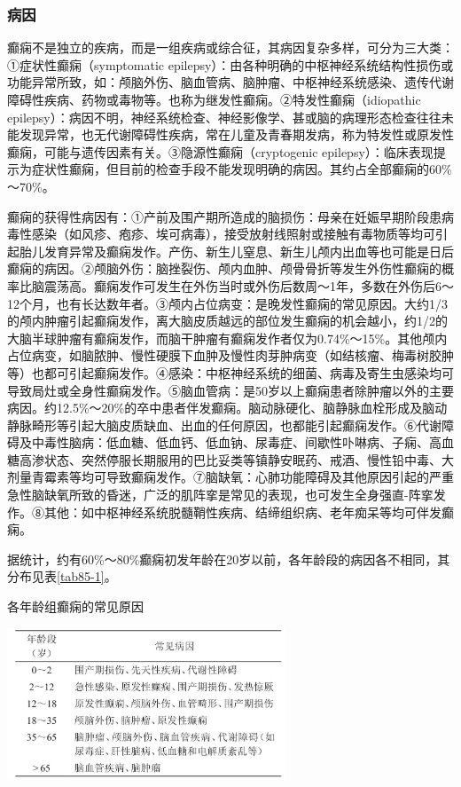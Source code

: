 \subsubsection{病因}

癫痫不是独立的疾病，而是一组疾病或综合征，其病因复杂多样，可分为三大类：①症状性癫痫（symptomatic
epilepsy）：由各种明确的中枢神经系统结构性损伤或功能异常所致，如：颅脑外伤、脑血管病、脑肿瘤、中枢神经系统感染、遗传代谢障碍性疾病、药物或毒物等。也称为继发性癫痫。②特发性癫痫（idiopathic
epilepsy）：病因不明，神经系统检查、神经影像学、甚或脑的病理形态检查往往未能发现异常，也无代谢障碍性疾病，常在儿童及青春期发病，称为特发性或原发性癫痫，可能与遗传因素有关。③隐源性癫痫（cryptogenic
epilepsy）：临床表现提示为症状性癫痫，但目前的检查手段不能发现明确的病因。其约占全部癫痫的60\%～70\%。

癫痫的获得性病因有：①产前及围产期所造成的脑损伤：母亲在妊娠早期阶段患病毒性感染（如风疹、疱疹、埃可病毒），接受放射线照射或接触有毒物质等均可引起胎儿发育异常及癫痫发作。产伤、新生儿窒息、新生儿颅内出血等也可能是日后癫痫的病因。②颅脑外伤：脑挫裂伤、颅内血肿、颅骨骨折等发生外伤性癫痫的概率比脑震荡高。癫痫发作可发生在外伤当时或外伤后数周～1年，多数在外伤后6～12个月，也有长达数年者。③颅内占位病变：是晚发性癫痫的常见原因。大约1/3的颅内肿瘤引起癫痫发作，离大脑皮质越远的部位发生癫痫的机会越小，约1/2的大脑半球肿瘤有癫痫发作，而脑干肿瘤有癫痫发作者仅为0.74\%～15\%。其他颅内占位病变，如脑脓肿、慢性硬膜下血肿及慢性肉芽肿病变（如结核瘤、梅毒树胶肿等）也都可引起癫痫发作。④感染：中枢神经系统的细菌、病毒及寄生虫感染均可导致局灶或全身性癫痫发作。⑤脑血管病：是50岁以上癫痫患者除肿瘤以外的主要病因。约12.5\%～20\%的卒中患者伴发癫痫。脑动脉硬化、脑静脉血栓形成及脑动静脉畸形等引起大脑皮质缺血、出血的任何原因，也都能引起癫痫发作。⑥代谢障碍及中毒性脑病：低血糖、低血钙、低血钠、尿毒症、间歇性卟啉病、子痫、高血糖高渗状态、突然停服长期服用的巴比妥类等镇静安眠药、戒酒、慢性铅中毒、大剂量青霉素等均可导致癫痫发作。⑦脑缺氧：心肺功能障碍及其他原因引起的严重急性脑缺氧所致的昏迷，广泛的肌阵挛是常见的表现，也可发生全身强直-阵挛发作。⑧其他：如中枢神经系统脱髓鞘性疾病、结缔组织病、老年痴呆等均可伴发癫痫。

据统计，约有60\%～80\%癫痫初发年龄在20岁以前，各年龄段的病因各不相同，其分布见表\ref{tab85-1}。

\begin{table}[htbp]
\centering
\caption{各年龄组癫痫的常见原因}
\label{tab85-1}
\includegraphics[width=3.27083in,height=1.78125in]{./images/Image00384.jpg}
\end{table}

